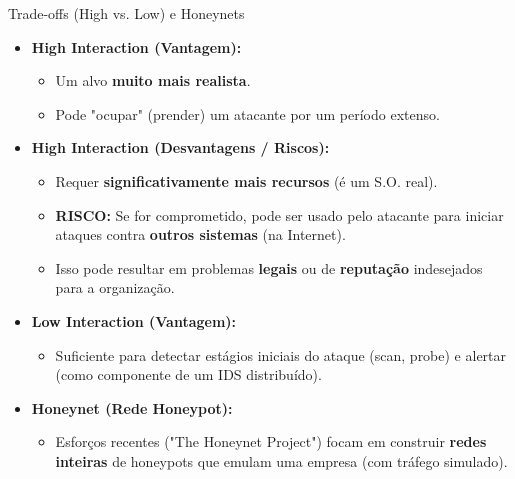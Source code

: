 \begin{frame}{Trade-offs (High vs. Low) e Honeynets}
    \begin{itemize}
        \item \textbf{High Interaction (Vantagem):}
              \begin{itemize}
                  \item Um alvo \textbf{muito mais realista}.
                  \item Pode "ocupar" (prender) um atacante por um período extenso.
              \end{itemize}

        \item \textbf{High Interaction (Desvantagens / Riscos):}
              \begin{itemize}
                  \item Requer \textbf{significativamente mais recursos} (é um S.O. real).
                  \item \textbf{RISCO:} Se for comprometido, pode ser usado pelo atacante para iniciar ataques contra \textbf{outros sistemas} (na Internet).
                  \item Isso pode resultar em problemas \textbf{legais} ou de \textbf{reputação} indesejados para a organização.
              \end{itemize}

        \item \textbf{Low Interaction (Vantagem):}
              \begin{itemize}
                  \item Suficiente para detectar estágios iniciais do ataque (scan, probe) e alertar (como componente de um IDS distribuído).
              \end{itemize}

        \item \textbf{Honeynet (Rede Honeypot):}
              \begin{itemize}
                  \item Esforços recentes ("The Honeynet Project") focam em construir \textbf{redes inteiras} de honeypots que emulam uma empresa (com tráfego simulado).
              \end{itemize}
    \end{itemize}
\end{frame}

